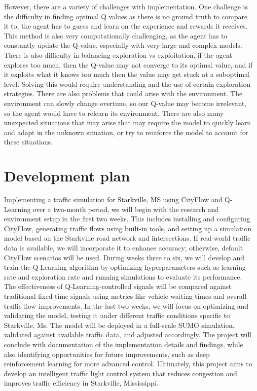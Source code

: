 \documentclass[conference]{IEEEtran}
\begin{document}
However, there are a variety of challenges with implementation. One challenge is the difficulty in finding optimal Q values as there is no ground truth to compare it to, the agent has to guess and learn on the experience and rewards it receives. This method is also very computationally challenging, as the agent has to constantly update the Q-value, especially with very large and complex models. There is also difficulty in balancing exploration vs exploitation, if the agent explores too much, then the Q-value may not converge to its optimal value, and if it exploits what it knows too much then the value may get stuck at a suboptimal level. Solving this would require understanding and the use of certain exploration strategies. There are also problems that could arise with the environment. The environment can slowly change overtime, so our Q-value may become irrelevant, so the agent would have to relearn its environment. There are also many unexpected situations that may arise that may require the model to quickly learn and adapt in the unknown situation, or try to reinforce the model to account for these situations.

\section{Development plan}

Implementing a traffic simulation for Starkville, MS using CityFlow and Q-Learning over a two-month period, we will begin with the research and environment setup in the first two weeks. This includes installing and configuring CityFlow, generating traffic flows using built-in tools, and setting up a simulation model based on the Starkville road network and intersections. If real-world traffic data is available, we will incorporate it to enhance accuracy; otherwise, default CityFlow scenarios will be used. During weeks three to six, we will develop and train the Q-Learning algorithm by optimizing hyperparameters such as learning rate and exploration rate and running simulations to evaluate its performance. The effectiveness of Q-Learning-controlled signals will be compared against traditional fixed-time signals using metrics like vehicle waiting times and overall traffic flow improvements. In the last two weeks, we will focus on optimizing and validating the model, testing it under different traffic conditions specific to Starkville, Ms. The model will be deployed in a full-scale SUMO simulation, validated against available traffic data, and adjusted accordingly. The project will conclude with documentation of the implementation details and findings, while also identifying opportunities for future improvements, such as deep reinforcement learning for more advanced control. Ultimately, this project aims to develop an intelligent traffic light control system that reduces congestion and improves traffic efficiency in Starkville, Mississippi.
\end{document}
